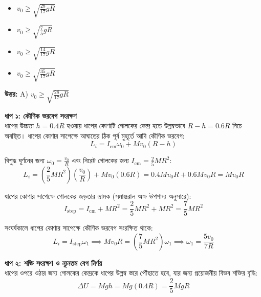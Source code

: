 \documentclass[12pt, a4paper]{article}
\begin{document}
{{%
\begin{itemize}[label={}, leftmargin=1cm, itemsep=0.5em]
    \item[\textbf{A)}] $v_0 \ge \sqrt{\frac{28}{17} g R}$
    \item[\textbf{B)}] $v_0 \ge \sqrt{\frac{7}{5} g R}$
    \item[\textbf{C)}] $v_0 \ge \sqrt{\frac{14}{17} g R}$
    \item[\textbf{D)}] $v_0 \ge \sqrt{\frac{35}{17} g R}$
\end{itemize}

\vspace{0.5em}
\begin{tcolorbox}[answerbox]
    \textbf{\color{success} উত্তর:} A) $v_0 \ge \sqrt{\frac{28}{17} g R}$
\end{tcolorbox}
\vspace{1em}

\begin{tcolorbox}[solutionbox={সমাধান (Solution)}]
    \noindent
    \textbf{ধাপ ১: কৌণিক ভরবেগ সংরক্ষণ} \\
    ধাপের উচ্চতা $h = 0.4R$ হওয়ায় ধাপের কোণাটি গোলকের কেন্দ্র হতে উল্লম্বভাবে $R - h = 0.6R$ নিচে অবস্থিত। ধাপের কোণার সাপেক্ষে আঘাতের ঠিক পূর্ব মুহূর্তে আদি কৌণিক ভরবেগ:
    \[ L_i = I_{\text{cm}} \omega_0 + M v_0 (R - h) \]
    
    বিশুদ্ধ ঘূর্ণনের জন্য $\omega_0 = \frac{v_0}{R}$ এবং নিরেট গোলকের জন্য $I_{\text{cm}} = \frac{2}{5} M R^2$:
    \[ L_i = \left(\frac{2}{5} M R^2\right) \left(\frac{v_0}{R}\right) + M v_0 (0.6R) = 0.4 M v_0 R + 0.6 M v_0 R = M v_0 R \]
    
    ধাপের কোণার সাপেক্ষে গোলকের জড়তার ভ্রামক (সমান্তরাল অক্ষ উপপাদ্য অনুসারে):
    \[ I_{\text{step}} = I_{\text{cm}} + M R^2 = \frac{2}{5} M R^2 + M R^2 = \frac{7}{5} M R^2 \]
    
    সংঘর্ষকালে ধাপের কোণার সাপেক্ষে কৌণিক ভরবেগ সংরক্ষিত থাকে:
    \[ L_i = I_{\text{step}} \omega_1 \implies M v_0 R = \left(\frac{7}{5} M R^2\right) \omega_1 \implies \omega_1 = \frac{5 v_0}{7 R} \]
    
    \vspace{0.5em}
    \noindent\textbf{ধাপ ২: শক্তি সংরক্ষণ ও ন্যূনতম বেগ নির্ণয়} \\
    ধাপের ওপরে ওঠার জন্য গোলকের কেন্দ্রকে ধাপের উল্লম্ব স্তরে পৌঁছাতে হবে, যার জন্য প্রয়োজনীয় বিভব শক্তির বৃদ্ধি:
    \[ \Delta U = M g h = M g (0.4R) = \frac{2}{5} M g R \]
    

\end{tcolorbox}}}
\end{document}
